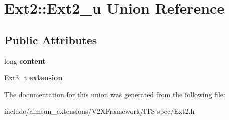 \hypertarget{unionExt2_1_1Ext2__u}{}\section{Ext2\+:\+:Ext2\+\_\+u Union Reference}
\label{unionExt2_1_1Ext2__u}
\subsection*{Public Attributes}
\begin{DoxyCompactItemize}
\item 
long {\bfseries content}\hypertarget{unionExt2_1_1Ext2__u_aa62aed1d7c710be8a4435a13de6b6c5a}{}\label{unionExt2_1_1Ext2__u_aa62aed1d7c710be8a4435a13de6b6c5a}

\item 
Ext3\+\_\+t {\bfseries extension}\hypertarget{unionExt2_1_1Ext2__u_ac2c1dd6a085a85a23a51a27d22508a7a}{}\label{unionExt2_1_1Ext2__u_ac2c1dd6a085a85a23a51a27d22508a7a}

\end{DoxyCompactItemize}


The documentation for this union was generated from the following file\+:\begin{DoxyCompactItemize}
\item 
include/aimsun\+\_\+extensions/\+V2\+X\+Framework/\+I\+T\+S-\/spec/Ext2.\+h\end{DoxyCompactItemize}
